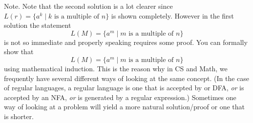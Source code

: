 {\textsc Note.}
Note that the second solution is a lot clearer since
$L(r) = \{a^k \mid k \text{ is a multiple of $n$} \}$ is
shown completely.
However in the first solution the statement
\[
L(M) = \{a^m \mid m \text{ is a multiple of $n$} \}
\]
is not so immediate and properly speaking requires some proof.
You can formally show that 
\[
L(M) = \{a^m \mid m \text{ is a multiple of $n$} \}
\]
using mathematical induction.
This is the reason why in CS and Math, we frequently have several different
ways of looking at the same concept.
(In the case of regular languages, a regular language is one that
is accepted by or DFA, \textit{or} is accepted by an NFA, \textit{or}
is generated by a regular expression.)
Sometimes one way of looking at a problem will yield a more natural 
solution/proof or one that is shorter.
